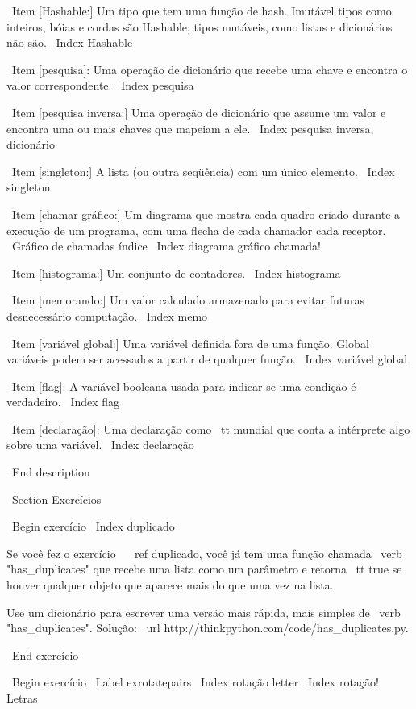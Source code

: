\documentclass[10pt]{book}
\begin{document}
{{{{{{{\ Item [Hashable:] Um tipo que tem uma função de hash. Imutável
tipos como inteiros,
bóias e cordas são Hashable; tipos mutáveis, como listas e
dicionários não são.
\ Index {} Hashable

\ Item [pesquisa]: Uma operação de dicionário que recebe uma chave e encontra
o valor correspondente.
\ Index {pesquisa}

\ Item [pesquisa inversa:] Uma operação de dicionário que assume um valor e encontra
uma ou mais chaves que mapeiam a ele.
\ Index {pesquisa inversa, dicionário}

\ Item [singleton:] A lista (ou outra seqüência) com um único elemento.
\ Index {singleton}

\ Item [chamar gráfico:] Um diagrama que mostra cada quadro criado durante
a execução de um programa, com uma flecha de cada chamador
cada receptor. 
\ {Gráfico de chamadas} índice
\ Index {diagrama gráfico chamada!}

\ Item [histograma:] Um conjunto de contadores.
\ Index {} histograma

\ Item [memorando:] Um valor calculado armazenado para evitar futuras desnecessário 
computação.
\ Index {memo}

\ Item [variável global:] Uma variável definida fora de uma função. Global
variáveis ​​podem ser acessados ​​a partir de qualquer função.
\ Index {variável global}

\ Item [flag]: A variável booleana usada para indicar se uma condição
é verdadeiro.
\ Index {flag}

\ Item [declaração]: Uma declaração como {\ tt mundial} que conta a
intérprete algo sobre uma variável.
\ Index {declaração}

\ End {description}

\ Section {Exercícios}

\ Begin {} exercício
\ Index {} duplicado

Se você fez o exercício ~ \ ref {} duplicado, você já tem
uma função chamada \ verb "has_duplicates" que recebe uma lista
como um parâmetro e retorna {\ tt true} se houver qualquer objeto
que aparece mais do que uma vez na lista.

Use um dicionário para escrever uma versão mais rápida, mais simples de
\ verb "has_duplicates". 
Solução: \ url {http://thinkpython.com/code/has_duplicates.py}.

\ End {} exercício


\ Begin {} exercício
\ Label {} exrotatepairs
\ Index {rotação letter}
\ Index {rotação! Letras}

}}}}}}}
\end{document}

